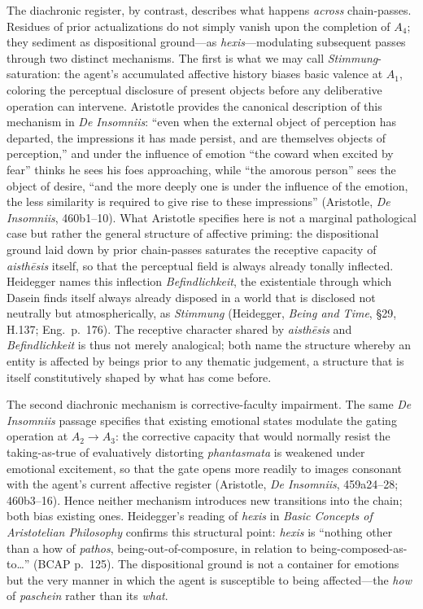 \documentclass{article}
\begin{document}
The diachronic register, by contrast, describes what happens \textit{across} chain-passes. Residues of prior actualizations do not simply vanish upon the completion of $A_4$; they sediment as dispositional ground---as \textit{hexis}---modulating subsequent passes through two distinct mechanisms. The first is what we may call \textit{Stimmung}-saturation: the agent's accumulated affective history biases basic valence at $A_1$, coloring the perceptual disclosure of present objects before any deliberative operation can intervene. Aristotle provides the canonical description of this mechanism in \textit{De Insomniis}: ``even when the external object of perception has departed, the impressions it has made persist, and are themselves objects of perception,'' and under the influence of emotion ``the coward when excited by fear'' thinks he sees his foes approaching, while ``the amorous person'' sees the object of desire, ``and the more deeply one is under the influence of the emotion, the less similarity is required to give rise to these impressions'' (Aristotle, \textit{De Insomniis}, 460b1--10). What Aristotle specifies here is not a marginal pathological case but rather the general structure of affective priming: the dispositional ground laid down by prior chain-passes saturates the receptive capacity of \textit{aisth\=esis} itself, so that the perceptual field is always already tonally inflected. Heidegger names this inflection \textit{Befindlichkeit}, the existentiale through which Dasein finds itself always already disposed in a world that is disclosed not neutrally but atmospherically, as \textit{Stimmung} (Heidegger, \textit{Being and Time}, \S 29, H.137; Eng.~p.~176). The receptive character shared by \textit{aisth\=esis} and \textit{Befindlichkeit} is thus not merely analogical; both name the structure whereby an entity is affected by beings prior to any thematic judgement, a structure that is itself constitutively shaped by what has come before.

The second diachronic mechanism is corrective-faculty impairment. The same \textit{De Insomniis} passage specifies that existing emotional states modulate the gating operation at $A_2 \rightarrow A_3$: the corrective capacity that would normally resist the taking-as-true of evaluatively distorting \textit{phantasmata} is weakened under emotional excitement, so that the gate opens more readily to images consonant with the agent's current affective register (Aristotle, \textit{De Insomniis}, 459a24--28; 460b3--16). Hence neither mechanism introduces new transitions into the chain; both bias existing ones. Heidegger's reading of \textit{hexis} in \textit{Basic Concepts of Aristotelian Philosophy} confirms this structural point: \textit{hexis} is ``nothing other than a how of \textit{pathos}, being-out-of-composure, in relation to being-composed-as-to\ldots'' (BCAP p.~125). The dispositional ground is not a container for emotions but the very manner in which the agent is susceptible to being affected---the \textit{how} of \textit{paschein} rather than its \textit{what}.
\end{document}
